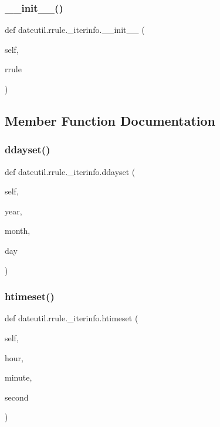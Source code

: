 \subsubsection{\texorpdfstring{\+\_\+\+\_\+init\+\_\+\+\_\+()}{\_\_init\_\_()}}
{\footnotesize\ttfamily def dateutil.\+rrule.\+\_\+iterinfo.\+\_\+\+\_\+init\+\_\+\+\_\+ (\begin{DoxyParamCaption}\item[{}]{self,  }\item[{}]{rrule }\end{DoxyParamCaption})}



\subsection{Member Function Documentation}
\mbox{\label{classdateutil_1_1rrule_1_1__iterinfo_a6de895d7c2b7f21baa41146533b13763}} 
\subsubsection{\texorpdfstring{ddayset()}{ddayset()}}
{\footnotesize\ttfamily def dateutil.\+rrule.\+\_\+iterinfo.\+ddayset (\begin{DoxyParamCaption}\item[{}]{self,  }\item[{}]{year,  }\item[{}]{month,  }\item[{}]{day }\end{DoxyParamCaption})}

\mbox{\label{classdateutil_1_1rrule_1_1__iterinfo_ab67ea968b699a07fdadbb1faf7bfe675}} 
\subsubsection{\texorpdfstring{htimeset()}{htimeset()}}
{\footnotesize\ttfamily def dateutil.\+rrule.\+\_\+iterinfo.\+htimeset (\begin{DoxyParamCaption}\item[{}]{self,  }\item[{}]{hour,  }\item[{}]{minute,  }\item[{}]{second }\end{DoxyParamCaption})}

